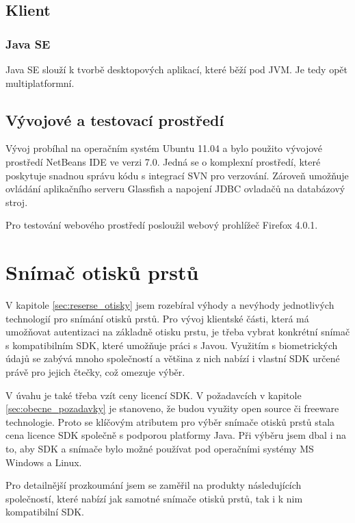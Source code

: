 \documentclass[11pt,twoside,a4paper]{book}
\begin{document}
\subsection{Klient}

\subsubsection{Java SE}

Java SE slouží k tvorbě desktopových aplikací, které běží pod JVM. Je tedy opět multiplatformní.

\subsection{Vývojové a testovací prostředí}

Vývoj probíhal na operačním systém Ubuntu 11.04 a bylo použito vývojové prostředí NetBeans IDE ve verzi 7.0. Jedná se o komplexní prostředí, které poskytuje snadnou správu kódu s integrací SVN pro verzování. Zároveň umožňuje ovládání aplikačního serveru Glassfish a napojení JDBC ovladačů na databázový stroj.

Pro testování webového prostředí posloužil webový prohlížeč Firefox 4.0.1.

\section{Snímač otisků prstů}

V kapitole \ref{sec:reserse_otisky} jsem rozebíral výhody a nevýhody jednotlivých technologií pro snímání otisků prstů. Pro vývoj klientské části, která má umožňovat autentizaci na základně otisku prstu, je třeba vybrat konkrétní snímač s kompatibilním SDK, které umožňuje práci s Javou. Využitím s biometrických údajů se zabývá mnoho společností a většina z nich nabízí i vlastní SDK určené právě pro jejich čtečky, což omezuje výběr. 

V úvahu je také třeba vzít ceny licencí SDK. V požadavcích v kapitole \ref{sec:obecne_pozadavky} je stanoveno, že budou využity open source či freeware technologie. Proto se klíčovým atributem pro výběr snímače otisků prstů stala cena licence SDK společně s podporou platformy Java. Při výběru jsem dbal i na to, aby SDK a snímače bylo možné používat pod operačními systémy MS Windows a Linux.

Pro detailnější prozkoumání jsem se zaměřil na produkty následujících společností, které nabízí jak samotné snímače otisků prstů, tak i k nim kompatibilní SDK.
\end{document}
